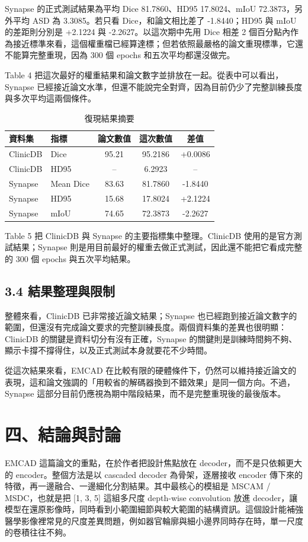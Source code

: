\documentclass[a4paper,12pt,twocolumn]{article}
\begin{document}
Synapse 的正式測試結果為平均 Dice 81.7860、HD95 17.8024、mIoU 72.3873，另外平均 ASD 為 3.3085。若只看 Dice，和論文相比差了 -1.8440；HD95 與 mIoU 的差距則分別是 +2.1224 與 -2.2627。以這次期中先用 Dice 相差 2 個百分點內作為接近標準來看，這個權重檔已經算達標；但若依照最嚴格的論文重現標準，它還不能算完整重現，因為 300 個 epochs 和五次平均都還沒做完。

Table 4 把這次最好的權重結果和論文數字並排放在一起。從表中可以看出，Synapse 已經接近論文水準，但還不能說完全對齊，因為目前仍少了完整訓練長度與多次平均這兩個條件。

\begin{table}[t]
\centering
\caption{復現結果摘要}
\scriptsize
\setlength{\tabcolsep}{7pt}
\renewcommand{\arraystretch}{1.18}
\begin{tabular}{l l c c c}
\toprule
\textbf{資料集} & \textbf{指標} & \textbf{論文數值} & \textbf{這次數值} & \textbf{差值} \\
\midrule
ClinicDB & Dice & 95.21 & 95.2186 & +0.0086 \\
ClinicDB & HD95 & -- & 6.2923 & -- \\
Synapse & Mean Dice & 83.63 & 81.7860 & -1.8440 \\
Synapse & HD95 & 15.68 & 17.8024 & +2.1224 \\
Synapse & mIoU & 74.65 & 72.3873 & -2.2627 \\
\bottomrule
\end{tabular}
\end{table}

Table 5 把 ClinicDB 與 Synapse 的主要指標集中整理。ClinicDB 使用的是官方測試結果；Synapse 則是用目前最好的權重去做正式測試，因此還不能把它看成完整的 300 個 epochs 與五次平均結果。

\subsection*{3.4 結果整理與限制}
整體來看，ClinicDB 已非常接近論文結果；Synapse 也已經跑到接近論文數字的範圍，但還沒有完成論文要求的完整訓練長度。兩個資料集的差異也很明顯：ClinicDB 的關鍵是資料切分有沒有正確，Synapse 的關鍵則是訓練時間夠不夠、顯示卡撐不撐得住，以及正式測試本身就要花不少時間。

從這次結果來看，EMCAD 在比較有限的硬體條件下，仍然可以維持接近論文的表現，這和論文強調的「用較省的解碼器換到不錯效果」是同一個方向。不過，Synapse 這部分目前仍應視為期中階段結果，而不是完整重現後的最後版本。

\section*{四、結論與討論}
EMCAD 這篇論文的重點，在於作者把設計焦點放在 decoder，而不是只依賴更大的 encoder。整個方法是以 cascaded decoder 為骨架，逐層接收 encoder 傳下來的特徵，再一邊融合、一邊細化分割結果。其中最核心的模組是 MSCAM / MSDC，也就是把 [1, 3, 5] 這組多尺度 depth-wise convolution 放進 decoder，讓模型在還原影像時，同時看到小範圍細節與較大範圍的結構資訊。這個設計能補強醫學影像裡常見的尺度差異問題，例如器官輪廓與細小邊界同時存在時，單一尺度的卷積往往不夠。
\end{document}
